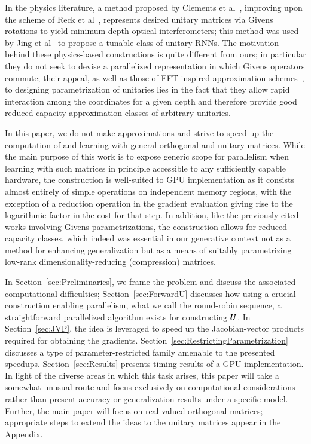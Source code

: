 \documentclass[superscriptaddress,floatfix]{article}
\begin{document}
In the physics literature, a method proposed by Clements et
al~\cite{clements2016optimal}, improving upon the scheme of Reck et
al~\cite{reck1994experimental}, represents desired unitary matrices via Givens
rotations to yield minimum depth optical interferometers; this
method was used by Jing et al~\cite{jing2017tunable} to propose a tunable
class of unitary RNNs. The motivation behind these physics-based
constructions is quite different from ours; in particular they do
not seek to devise a parallelized representation in which Givens
operators commute; their appeal, as well as those of FFT-inspired
approximation schemes~\cite{mathieu2014fast}, to designing
parametrization of unitaries lies in the fact that they allow rapid
interaction among the coordinates for a given depth and therefore
provide good reduced-capacity approximation classes of arbitrary
unitaries.

In this paper, we do not make approximations and strive to speed up
the computation of and learning with general orthogonal and unitary
matrices. While the main purpose of this work is to expose generic
scope for parallelism when learning with such matrices in principle
accessible to any sufficiently capable hardware, the construction is
well-suited to GPU implementation as it consists almost entirely of
simple operations on independent memory regions, with the exception
of a reduction operation in the gradient evaluation giving rise to
the logarithmic factor in the cost for that step. In addition, like
the previously-cited works involving Givens parametrizations, the
construction allows for reduced-capacity classes, which indeed was
essential in our generative context not as a method for enhancing
generalization but as a means of suitably parametrizing low-rank
dimensionality-reducing (compression) matrices.

In Section~\ref{sec:Preliminaries}, we frame the problem and discuss
the associated computational difficulties; Section~\ref{sec:ForwardU}
discusses how using a crucial construction enabling parallelism, what
we call the round-robin sequence, a straightforward parallelized
algorithm exists for constructing ${\pmb{U}}$. In Section~\ref{sec:JVP}, the
idea is leveraged to speed up the Jacobian-vector products required
for obtaining the gradients.
Section~\ref{sec:RestrictingParametrization} discusses a type of
parameter-restricted family amenable to the presented
speedups. Section~\ref{sec:Results} presents timing results of a GPU
implementation.  In light of the diverse areas in which this task
arises, this paper will take a somewhat unusual route and focus
exclusively on computational considerations rather than present
accuracy or generalization results under a specific model. Further,
the main paper will focus on real-valued orthogonal matrices;
appropriate steps to extend the ideas to the unitary matrices appear
in the Appendix.
\end{document}
